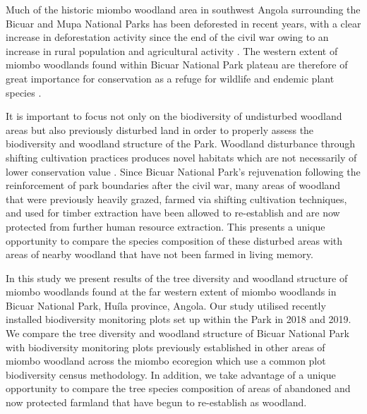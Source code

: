 \documentclass[diversity,article,submit,moreauthors,pdftex]{Definitions/mdpi}
\begin{document}
Much of the historic miombo woodland area in southwest Angola surrounding the Bicuar and Mupa National Parks has been deforested in recent years, with a clear increase in deforestation activity since the end of the civil war owing to an increase in rural population and agricultural activity \citep{Schneibel2013, Huntley2019}. The western extent of miombo woodlands found within Bicuar National Park plateau are therefore of great importance for conservation as a refuge for wildlife and endemic plant species \citep{Huntley2019}.

It is important to focus not only on the biodiversity of undisturbed woodland areas but also previously disturbed land in order to properly assess the biodiversity and woodland structure of the Park. Woodland disturbance through shifting cultivation practices produces novel habitats which are not necessarily of lower conservation value \citep{McNicol2015, Goncalves2017}. Since Bicuar National Park's rejuvenation following the reinforcement of park boundaries after the civil war, many areas of woodland that were previously heavily grazed, farmed via shifting cultivation techniques, and used for timber extraction have been allowed to re-establish and are now protected from further human resource extraction. This presents a unique opportunity to compare the species composition of these disturbed areas with areas of nearby woodland that have not been farmed in living memory.

In this study we present results of the tree diversity and woodland structure of miombo woodlands found at the far western extent of miombo woodlands in Bicuar National Park, Hu\'{i}la province, Angola. Our study utilised recently installed biodiversity monitoring plots set up within the Park in 2018 and 2019. We compare the tree diversity and woodland structure of Bicuar National Park with biodiversity monitoring plots previously established in other areas of miombo woodland across the miombo ecoregion which use a common plot biodiversity census methodology. In addition, we take advantage of a unique opportunity to compare the tree species composition of areas of abandoned and now protected farmland that have begun to re-establish as woodland. 

\end{document}

